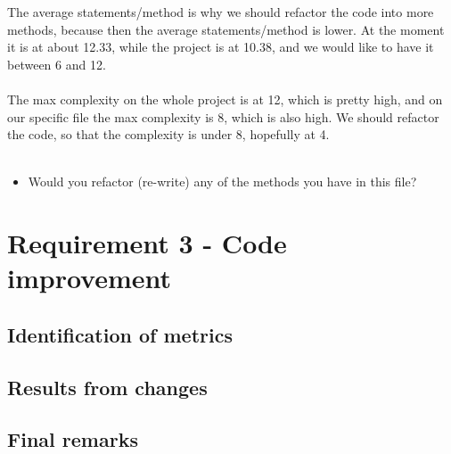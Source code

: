 \documentclass[UKenglish]{article}  %
\begin{document}
The average statements/method is why we should refactor the code into more methods, because then the average statements/method is lower. At the moment it is at about 12.33, while the project is at 10.38, and we would like to have it between 6 and 12. \\\\
The max complexity on the whole project is at 12, which is pretty high, and on our specific file the max complexity is 8, which is also high. We should refactor the code, so that the complexity is under 8, hopefully at 4. \\\\

\begin{itemize}
\item Would you refactor (re-write) any of the methods you have in this file?
\end{itemize}

\section{Requirement 3 - Code improvement}

\subsection{Identification of metrics}

\subsection{Results from changes}

\subsection{Final remarks}
\end{document}
